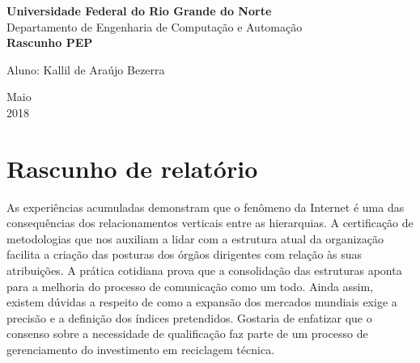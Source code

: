 \documentclass[a4paper, 12pt]{article}
\begin{document}

\begin{titlepage}
	\begin{center}
	

		\textbf{\Large{Universidade Federal do Rio Grande do Norte}}\\
		\large{Departamento de Engenharia de Computação e Automação}\\ 
		\vspace{15pt}
        \vspace{95pt}
        \textbf{\large{Rascunho PEP}}\\
		\vspace{3,5cm}
	\end{center}
	
	\begin{flushleft}
		\begin{tabbing}
			Aluno: Kallil de Araújo Bezerra \\
	\end{tabbing}
 \end{flushleft}
	\vspace{1cm}
	
	\begin{center}
		\vspace{\fill}
			Maio\\
		    2018
			\end{center}
\end{titlepage}


\newpage
\tableofcontents
\thispagestyle{empty}

\newpage
{}
\section{Rascunho de relatório}

As experiências acumuladas demonstram que o fenômeno da Internet é uma das consequências dos relacionamentos verticais entre as hierarquias. A certificação de metodologias que nos auxiliam a lidar com a estrutura atual da organização facilita a criação das posturas dos órgãos dirigentes com relação às suas atribuições. A prática cotidiana prova que a consolidação das estruturas aponta para a melhoria do processo de comunicação como um todo. Ainda assim, existem dúvidas a respeito de como a expansão dos mercados mundiais exige a precisão e a definição dos índices pretendidos. Gostaria de enfatizar que o consenso sobre a necessidade de qualificação faz parte de um processo de gerenciamento do investimento em reciclagem técnica.
\end{document}
